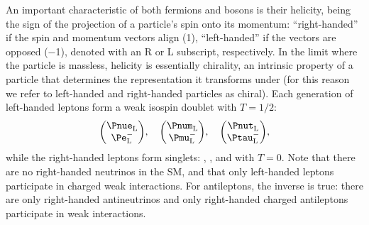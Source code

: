 An important characteristic of both fermions and bosons is their helicity, being the sign of the projection of a particle's spin onto its momentum: ``right-handed'' if the spin and momentum vectors align (\num{+1}), ``left-handed'' if the vectors are opposed (\num{-1}), denoted with an R or L subscript, respectively. In the limit where the particle is massless, helicity is essentially chirality, an intrinsic property of a particle that determines the representation it transforms under (for this reason we refer to left-handed and right-handed particles as chiral). Each generation of left-handed leptons form a weak isospin doublet with $T = 1/2$:
\begin{equation}
    \begin{pmatrix}
        \spinor{\Pnue}{L}{} \\
        \spinor{\Pe}{L}{$-$}
    \end{pmatrix}\!,\quad
    \begin{pmatrix}
        \spinor{\Pnum}{L}{} \\
        \spinor{\Pmu}{L}{$-$}
    \end{pmatrix}\!,\quad
    \begin{pmatrix}
        \spinor{\Pnut}{L}{} \\
        \spinor{\Ptau}{L}{$-$}
    \end{pmatrix}\!,
\end{equation} 
while the right-handed leptons form singlets: , , and  with $T = 0$. Note that there are no right-handed neutrinos in the SM, and that only left-handed leptons participate in charged weak interactions. For antileptons, the inverse is true: there are only right-handed antineutrinos and only right-handed charged antileptons participate in weak interactions.

